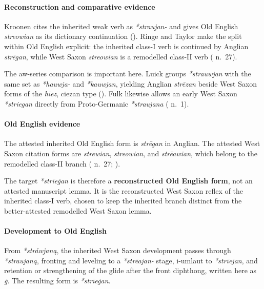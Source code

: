 \documentclass[
  british,
  a4paper,
]{article}
\begin{document}
\paragraph{Reconstruction and comparative
evidence}\label{reconstruction-and-comparative-evidence-69}

Kroonen cites the inherited weak verb as \emph{*straujan-} and gives Old
English \emph{streowian} as its dictionary continuation
(). Ringe and Taylor make
the split within Old English explicit: the inherited class-I verb is
continued by Anglian \emph{strēgan}, while West Saxon \emph{streowian}
is a remodelled class-II verb ( n.~27).

The aw-series comparison is important here. Luick groups
\emph{*strauwjan} with the same set as \emph{*hauwja-} and
\emph{*kauwjan}, yielding Anglian \emph{strēzan} beside West Saxon forms
of the \emph{hīez}, ciezan type (). Fulk likewise allows an early West Saxon
\emph{*striegan} directly from Proto-Germanic \emph{*straujana}
( n.~1).

\paragraph{Old English evidence}\label{old-english-evidence-69}

The attested inherited Old English form is \emph{strēgan} in Anglian.
The attested West Saxon citation forms are \emph{strewian},
\emph{streowian}, and \emph{strēawian}, which belong to the remodelled
class-II branch ( n.~27; ).

The target \emph{*strīeġan} is therefore a \textbf{reconstructed Old
English form}, not an attested manuscript lemma. It is the reconstructed
West Saxon reflex of the inherited class-I verb, chosen to keep the
inherited branch distinct from the better-attested remodelled West Saxon
lemma.

\paragraph{Development to Old
English}\label{development-to-old-english-69}

From \emph{*stráwjaną}, the inherited West Saxon development passes
through \emph{*straujaną}, fronting and leveling to a \emph{*strēajan-}
stage, i-umlaut to \emph{*strīejan}, and retention or strengthening of
the glide after the front diphthong, written here as \emph{ġ}. The
resulting form is \emph{*strīeġan}.
\end{document}
